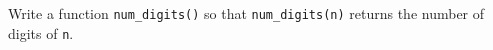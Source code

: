 Write a function \texttt{num\_digits()} so that \texttt{num\_digits(n)} returns the number of digits of \texttt{n}.

